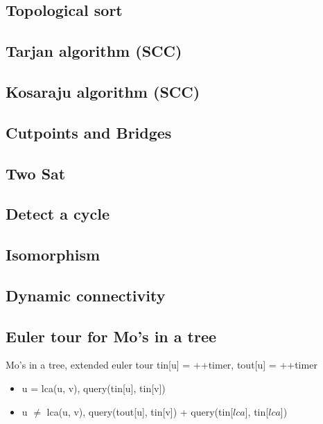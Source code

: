 
\subsection{Topological sort }

\subsection{Tarjan algorithm (SCC) }

\subsection{Kosaraju algorithm (SCC) }

\subsection{Cutpoints and Bridges }

\subsection{Two Sat }

\subsection{Detect a cycle }

\subsection{Isomorphism }

\subsection{Dynamic connectivity }


\subsection{Euler tour for Mo's in a tree }
Mo's in a tree, extended euler tour \small{tin[u] = ++timer, tout[u] = ++timer} 
\begin{itemize}[noitemsep]
  \item u = lca(u, v), query(tin[u], tin[v]) 
  \item u $\neq$ lca(u, v), query(tout[u], tin[v]) + query(tin[$lca$], tin[$lca$])
\end{itemize}

